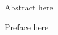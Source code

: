 \makecoverpage
\makecopyrightpage
\begin{abstractpage}[english]
Abstract here
\end{abstractpage}
Preface here
\newpage
\setcounter{tocdepth}{2}
\thesistableofcontents
